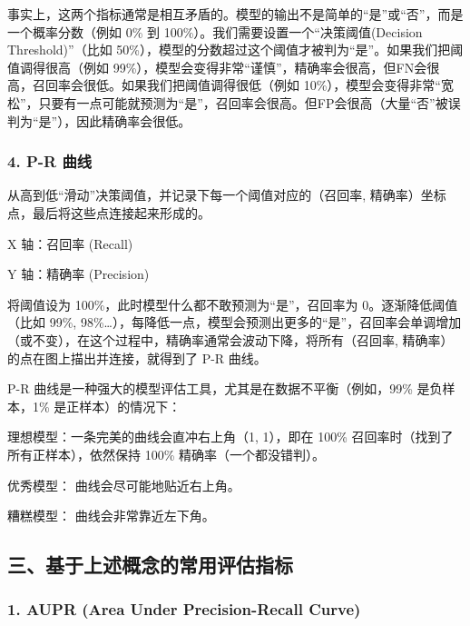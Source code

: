 事实上，这两个指标通常是相互矛盾的。模型的输出不是简单的``是''或``否''，而是一个概率分数（例如 0\% 到 100\%）。我们需要设置一个``决策阈值(Decision Threshold)''（比如 50\%），模型的分数超过这个阈值才被判为``是''。如果我们把阈值调得很高（例如 99\%），模型会变得非常``谨慎''，精确率会很高，但FN会很高，召回率会很低。如果我们把阈值调得很低（例如 10\%），模型会变得非常``宽松''，只要有一点可能就预测为``是''，召回率会很高。但FP会很高（大量``否''被误判为``是''），因此精确率会很低。

\hypertarget{p-r-ux66f2ux7ebf}{%
\subsubsection{4. P-R 曲线}\label{p-r-ux66f2ux7ebf}}

从高到低``滑动''决策阈值，并记录下每一个阈值对应的（召回率, 精确率）坐标点，最后将这些点连接起来形成的。

X 轴：召回率 (Recall)

Y 轴：精确率 (Precision)

将阈值设为 100\%，此时模型什么都不敢预测为``是''，召回率为 0。逐渐降低阈值（比如 99\%, 98\%\ldots），每降低一点，模型会预测出更多的``是''，召回率会单调增加（或不变），在这个过程中，精确率通常会波动下降，将所有（召回率, 精确率）的点在图上描出并连接，就得到了 P-R 曲线。

P-R 曲线是一种强大的模型评估工具，尤其是在数据不平衡（例如，99\% 是负样本，1\% 是正样本）的情况下：

理想模型：一条完美的曲线会直冲右上角（1, 1），即在 100\% 召回率时（找到了所有正样本），依然保持 100\% 精确率（一个都没错判）。

优秀模型： 曲线会尽可能地贴近右上角。

糟糕模型： 曲线会非常靠近左下角。

\hypertarget{ux4e09ux57faux4e8eux4e0aux8ff0ux6982ux5ff5ux7684ux5e38ux7528ux8bc4ux4f30ux6307ux6807}{%
\subsection{三、基于上述概念的常用评估指标}\label{ux4e09ux57faux4e8eux4e0aux8ff0ux6982ux5ff5ux7684ux5e38ux7528ux8bc4ux4f30ux6307ux6807}}

\hypertarget{aupr-area-under-precision-recall-curve}{%
\subsubsection{1. AUPR (Area Under Precision-Recall Curve)}\label{aupr-area-under-precision-recall-curve}}

